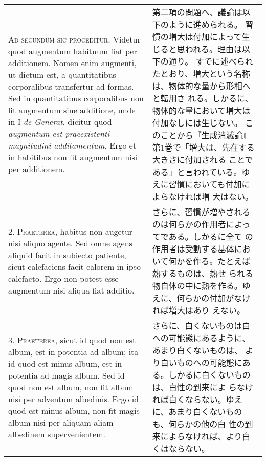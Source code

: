 \documentclass[10pt]{jsarticle} %
\begin{document}
\begin{longtable}{p{21em}p{21em}}


{\scshape Ad secundum sic proceditur}. Videtur quod augmentum habituum fiat per
additionem. Nomen enim augmenti, ut dictum est, a quantitatibus
corporalibus transfertur ad formas. Sed in quantitatibus corporalibus
non fit augmentum sine additione, unde in I {\itshape de Generat}. dicitur quod
{\itshape augmentum est praeexistenti magnitudini additamentum}. Ergo et in
habitibus non fit augmentum nisi per additionem.


&

第二項の問題へ、議論は以下のように進められる。
習慣の増大は付加によって生じると思われる。理由は以下の通り。
すでに述べられたとおり、増大という名称は、物体的な量から形相へと転用さ
 れる。しかるに、物体的な量において増大は付加なしには生じない。
このことから『生成消滅論』第1巻で「増大は、先在する大きさに付加される
 ことである」と言われている。ゆえに習慣においても付加によらなければ増
 大はない。

\\



2. {\scshape Praeterea}, habitus non augetur nisi aliquo agente. Sed omne agens
aliquid facit in subiecto patiente, sicut calefaciens facit calorem in
ipso calefacto. Ergo non potest esse augmentum nisi aliqua fiat
additio.


&

さらに、習慣が増やされるのは何らかの作用者によってである。しかるに全て
 の作用者は受動する基体において何かを作る。たとえば熱するものは、熱せ
 られる物自体の中に熱を作る。ゆえに、何らかの付加がなければ増大はあり
 えない。

\\



3. {\scshape Praeterea}, sicut id quod non est album, est in potentia ad album; ita
id quod est minus album, est in potentia ad magis album. Sed id quod
non est album, non fit album nisi per adventum albedinis. Ergo id quod
est minus album, non fit magis album nisi per aliquam aliam albedinem
supervenientem.


&

さらに、白くないものは白への可能態にあるように、あまり白くないものは、
 より白いものへの可能態にある。しかるに白くないものは、白性の到来によ
 らなければ白くならない。ゆえに、あまり白くないものも、何らかの他の白
 性の到来によらなければ、より白くはならない。

\\




\end{longtable}
\end{document}
